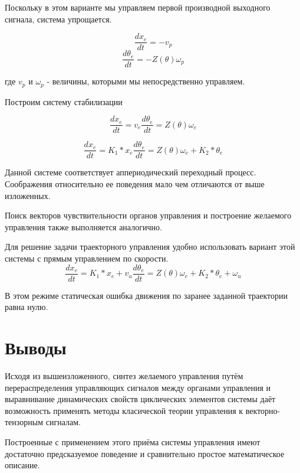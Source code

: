 \documentclass[a4paper]{article}
\begin{document}
Поскольку в этом варианте мы управляем первой производной выходного сигнала, система упрощается.

\begin{equation}
\frac{dx_e}{dt} = - v_p
\end{equation}
\begin{equation}
\frac{d\theta_e}{dt} = - Z(\theta) \omega_p
\end{equation}

где $v_p$ и $\omega_p$ - величины, которыми мы непосредственно управляем.

Построим систему стабилизации

\begin{equation}
\frac{dx_e}{dt} = v_e
\frac{d\theta_e}{dt} = Z(\theta) \omega_e
\end{equation}

\begin{equation}
\frac{dx_e}{dt} = K_1 * x_e
\frac{d\theta_e}{dt} = Z(\theta) \omega_e + K_2 * \theta_e
\end{equation}

Данной системе соответствует аппериодический переходный процесс. Соображения относительно ее поведения мало чем отличаются от выше изложенных.

Поиск векторов чувствительности органов управления и построение желаемого управления также выполняется аналогично.

Для решение задачи траекторного управления удобно использовать вариант этой системы с прямым управлением по скорости.
\begin{equation}
\frac{dx_e}{dt} = K_1 * x_e + v_u
\frac{d\theta_e}{dt} = Z(\theta) \omega_e + K_2 * \theta_e + \omega_u
\end{equation}

В этом режиме статическая ошибка движения по заранее заданной траектории равна нулю.

\section{Выводы}
Исходя из вышеизложенного, синтез желаемого управления путём перераспределения управляющих сигналов между органами управления и выравнивание динамических свойств циклических элементов системы даёт возможность применять методы класической теории управления к векторно-тензорным сигналам.

Построенные с применением этого приёма системы управления имеют достаточно предсказуемое поведение и сравнительно простое математическое описание. 
\end{document}
